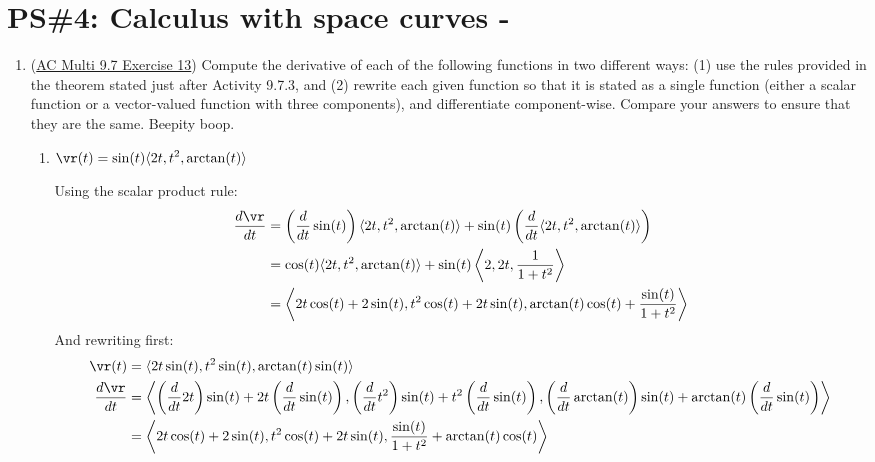 


%


\allowdisplaybreaks
\section{PS\#4: Calculus with space curves -  }

\begin{enumerate}[leftmargin=0pt]

\item (\href{https://activecalculus.org/multi/S-9-7-Vector-Valued-Functions-Derivatives.html#Ez_9_7_1}{AC Multi 9.7 Exercise 13}) Compute the derivative of each of the following functions in two different ways: (1) use the rules provided in the theorem stated just after Activity 9.7.3, and (2) rewrite each given function so that it is stated as a single function (either a scalar function or a vector-valued function with three components), and differentiate component-wise. Compare your answers to ensure that they are the same. Beepity boop.
\begin{enumerate}
    \item $\displaystyle \vr(t) = \sin(t) \langle 2t, t^2, \arctan(t) \rangle$
    
    \begin{red}
        Using the scalar product rule:
        \begin{align*}
            \frac{d\vr}{dt} &= \left(\dfrac{d}{dt}\sin(t)\right) 
            \langle 2t, t^2, \arctan(t) \rangle
            + \sin(t)
            \left(\dfrac{d}{dt} \langle 2t, t^2, \arctan(t) \rangle\right) \\
            &= \cos(t) \langle 2t, t^2, \arctan(t) \rangle
            + \sin(t) \left\langle 2, 2t, \dfrac{1}{1+t^2} \right\rangle \\
            &= \left\langle 2t\cos(t) + 2\sin(t),
                            t^2\cos(t)+2t\sin(t),
                            \arctan(t) \cos(t) + \dfrac{\sin(t)}{1+t^2} \right\rangle
        \end{align*}
        And rewriting first:
        \begin{align*}
            \vr(t) &= \langle 2t \sin(t) , t^2 \sin(t) , \arctan(t) \sin(t)  \rangle \\
            \frac{d\vr}{dt} &= \left\langle
                    \left(\frac{d}{dt} 2t\right) \sin(t) + 2t \left(\frac{d}{dt}\sin(t)\right),
                    \left(\frac{d}{dt}t^2\right)\sin(t) + t^2 \left(\frac{d}{dt}\sin(t)\right),
                    \left(\frac{d}{dt}\arctan(t)\right) \sin(t) + \arctan(t) \left(\frac{d}{dt} \sin(t) \right)
                \right\rangle \\
                &= \left\langle 2t\cos(t) + 2\sin(t),
                t^2\cos(t)+2t\sin(t),
                \dfrac{\sin(t)}{1+t^2} + \arctan(t) \cos(t) \right\rangle
        \end{align*}
    \end{red}


\end{enumerate}
\end{enumerate}
